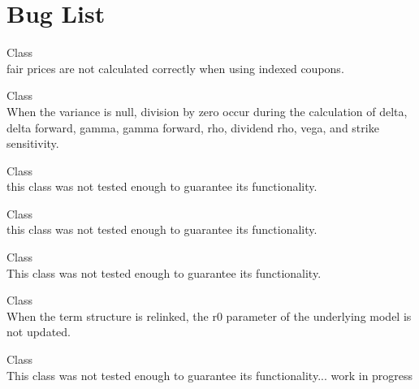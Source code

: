 \chapter{Bug List}
\hypertarget{bug}{}\label{bug}

\begin{DoxyRefList}
\item[Class \doxylink{class_quant_lib_1_1_asset_swap}{Quant\+Lib\+::Asset\+Swap} ]\hfill \\
\label{bug__bug000003}%
%
fair prices are not calculated correctly when using indexed coupons.  
\item[Class \doxylink{class_quant_lib_1_1_black_calculator}{Quant\+Lib\+::Black\+Calculator} ]\hfill \\
\label{bug__bug000009}%
%
When the variance is null, division by zero occur during the calculation of delta, delta forward, gamma, gamma forward, rho, dividend rho, vega, and strike sensitivity.  
\item[Class \doxylink{class_quant_lib_1_1_cox_ingersoll_ross}{Quant\+Lib\+::Cox\+Ingersoll\+Ross} ]\hfill \\
\label{bug__bug000005}%
%
this class was not tested enough to guarantee its functionality. 
\item[Class \doxylink{class_quant_lib_1_1_extended_cox_ingersoll_ross}{Quant\+Lib\+::Extended\+Cox\+Ingersoll\+Ross} ]\hfill \\
\label{bug__bug000006}%
%
this class was not tested enough to guarantee its functionality. 
\item[Class \doxylink{class_quant_lib_1_1_g2}{Quant\+Lib\+::G2} ]\hfill \\
\label{bug__bug000008}%
%
This class was not tested enough to guarantee its functionality. 
\item[Class \doxylink{class_quant_lib_1_1_hull_white}{Quant\+Lib\+::Hull\+White} ]\hfill \\
\label{bug__bug000007}%
%
When the term structure is relinked, the r0 parameter of the underlying  model is not updated. 
\item[Class \doxylink{class_quant_lib_1_1_hybrid_heston_hull_white_process}{Quant\+Lib\+::Hybrid\+Heston\+Hull\+White\+Process} ]\hfill \\
\label{bug__bug000010}%
%
This class was not tested enough to guarantee its functionality... work in progress 

\end{DoxyRefList}
